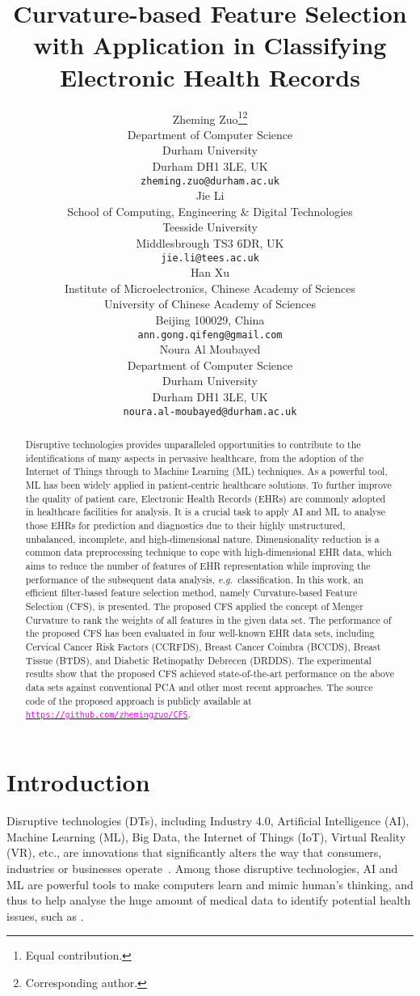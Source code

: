 \documentclass{article}
\title{Curvature-based Feature Selection with Application in Classifying Electronic Health Records}
\author{
    Zheming Zuo\thanks{Equal contribution.}\hspace{0.15cm}\thanks{Corresponding author.}\\
Department of Computer Science\\
  Durham University\\
  Durham DH1 3LE, UK\\
  \texttt{zheming.zuo@durham.ac.uk} \\
\And
 Jie Li \\
  School of Computing, Engineering \& Digital Technologies\\
  Teesside University\\
  Middlesbrough TS3 6DR, UK\\
  \texttt{jie.li@tees.ac.uk} \\
  \And
 Han Xu \\
  Institute of Microelectronics, Chinese Academy of Sciences\\
  University of Chinese Academy of Sciences\\
  Beijing 100029, China\\
  \texttt{ann.gong.qifeng@gmail.com} \\
  \And
  Noura Al Moubayed\\
Department of Computer Science\\
  Durham University\\
  Durham DH1 3LE, UK\\
  \texttt{noura.al-moubayed@durham.ac.uk} \\
}
\newcommand{\zzeg}{\emph{e.g.}~}
\newcommand*{\1}{\textcolor{magenta}}
\begin{document}
\maketitle
\begin{abstract}
Disruptive technologies provides unparalleled opportunities to contribute to the identifications of many aspects in pervasive healthcare, from the adoption of the Internet of Things through to Machine Learning (ML) techniques. As a powerful tool, ML has been widely applied in patient-centric healthcare solutions. To further improve the quality of patient care, Electronic Health Records (EHRs) are commonly adopted in healthcare facilities for analysis. It is a crucial task to apply AI and ML to analyse those EHRs for prediction and diagnostics due to their highly unstructured, unbalanced, incomplete, and high-dimensional nature. Dimensionality reduction is a common data preprocessing technique to cope with high-dimensional EHR data, which aims to reduce the number of features of EHR representation while improving the performance of the subsequent data analysis, \zzeg classification. In this work, an efficient filter-based feature selection method, namely Curvature-based Feature Selection (CFS), is presented. The proposed CFS applied the concept of Menger Curvature to rank the weights of all features in the given data set. The performance of the proposed CFS has been evaluated in four well-known EHR data sets, including Cervical Cancer Risk Factors (CCRFDS), Breast Cancer Coimbra (BCCDS), Breast Tissue (BTDS), and Diabetic Retinopathy Debrecen (DRDDS). The experimental results show that the proposed CFS achieved state-of-the-art performance on the above data sets against conventional PCA and other most recent approaches. The source code of the proposed approach is publicly available at \href{https://github.com/zhemingzuo/CFS}{\texttt{\1{https://github.com/zhemingzuo/CFS}}}.
\end{abstract}




	\section{Introduction}
    Disruptive technologies (DTs), including Industry 4.0, Artificial Intelligence (AI), Machine Learning (ML), Big Data, the Internet of Things (IoT), Virtual Reality (VR), etc., are innovations that significantly alters the way that consumers, industries or businesses operate~\cite{abdel2020intelligent}. Among those disruptive technologies, AI and ML are powerful tools to make computers learn and mimic human's thinking, and thus to help analyse the huge amount of medical data to identify potential health issues, such as \cite{chang2018computational, chang2018data}. 
	
\end{document}
